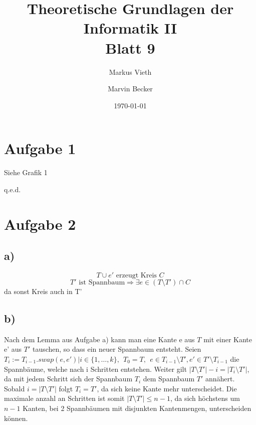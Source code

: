 \documentclass[a4paper,11pt,twoside]{article}
\title{Theoretische Grundlagen der Informatik II\\ Blatt 9}
\author{Markus Vieth \and Marvin Becker}
\date{\today}
\begin{document}
\maketitle
\cleardoublepage
\pagestyle{myheadings}

\section*{Aufgabe 1}
Siehe Grafik 1
\begin{flushright}
	q.e.d.
\end{flushright}
\section*{Aufgabe 2}
\subsection*{a)}
\[ T\cup e' \text{ erzeugt Kreis }C \]
\[ T'\text{ ist Spannbaum} \Rightarrow \exists e\in (T\setminus T')\cap C \]
da sonst Kreis auch in T'
\subsection{b)}
Nach dem Lemma aus Aufgabe a) kann man eine Kante e aus $T$ mit einer Kante e' aus $T'$ tauschen, so dass ein neuer Spannbaum entsteht. Seien $T_i:= T_{i-1}.swap(e,e') | i\in\{1,\ldots,k\},~~T_0=T,~~e\in T_{i-1}\setminus T', e'\in T'\setminus T_{i-1}$ die Spannbäume, welche nach i Schritten entstehen. Weiter gilt $|T\setminus T'| - i = |T_i\setminus T'|$, da mit jedem Schritt sich der Spannbaum $T_i$ dem Spannbaum $T'$ annähert. Sobald $i = |T\setminus T'|$ folgt $T_i = T'$, da sich keine Kante mehr unterscheidet. Die maximale anzahl an Schritten ist somit $|T\setminus T'| \leq n-1$, da sich höchstens um $n-1$ Kanten, bei 2 Spannbäumen mit disjunkten Kantenmengen, unterscheiden können.
\end{document}
